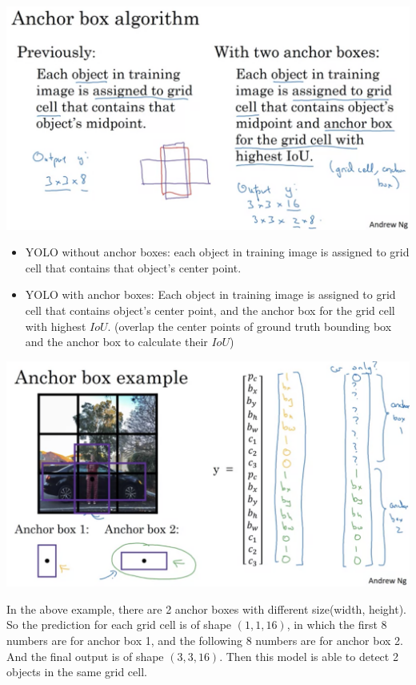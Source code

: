 \documentclass{article}
\begin{document}
\begin{center}
\includegraphics[scale=0.3]{./images/anchor_box_assign.png}
\end{center}

\begin{itemize}
    \item YOLO without anchor boxes: each object in training image is assigned to grid cell that contains that object's center point.
    \item YOLO with anchor boxes: Each object in training image is assigned to grid cell that contains object's center point, and the anchor box for the grid cell with highest \(IoU\). (overlap the center points of ground truth bounding box and the anchor box to calculate their \(IoU\))
\end{itemize}

\begin{center}
\includegraphics[scale=0.3]{./images/anchor_box_example.png}
\end{center}

\noindent In the above example, there are 2 anchor boxes with different size(width, height). So the prediction for each grid cell is of shape \((1, 1, 16)\), in which the first 8 numbers are for anchor box 1, and the following 8 numbers are for anchor box 2. And the final output is of shape \((3, 3, 16)\). Then this model is able to detect 2 objects in the same grid cell.
\end{document}
